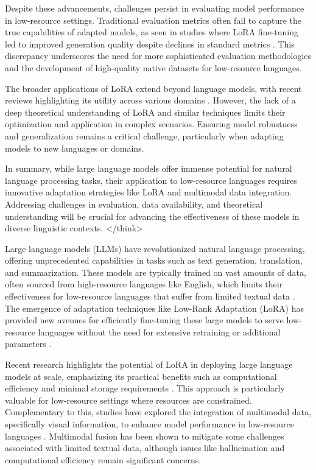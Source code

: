 \documentclass[conference]{IEEEtran}
\begin{document}
Despite these advancements, challenges persist in evaluating model performance in low-resource settings. Traditional evaluation metrics often fail to capture the true capabilities of adapted models, as seen in studies where LoRA fine-tuning led to improved generation quality despite declines in standard metrics \cite{b5}. This discrepancy underscores the need for more sophisticated evaluation methodologies and the development of high-quality native datasets for low-resource languages.

The broader applications of LoRA extend beyond language models, with recent reviews highlighting its utility across various domains \cite{b6}. However, the lack of a deep theoretical understanding of LoRA and similar techniques limits their optimization and application in complex scenarios. Ensuring model robustness and generalization remains a critical challenge, particularly when adapting models to new languages or domains.

In summary, while large language models offer immense potential for natural language processing tasks, their application to low-resource languages requires innovative adaptation strategies like LoRA and multimodal data integration. Addressing challenges in evaluation, data availability, and theoretical understanding will be crucial for advancing the effectiveness of these models in diverse linguistic contexts.
</think>

Large language models (LLMs) have revolutionized natural language processing, offering unprecedented capabilities in tasks such as text generation, translation, and summarization. These models are typically trained on vast amounts of data, often sourced from high-resource languages like English, which limits their effectiveness for low-resource languages that suffer from limited textual data \cite{b1}. The emergence of adaptation techniques like Low-Rank Adaptation (LoRA) has provided new avenues for efficiently fine-tuning these large models to serve low-resource languages without the need for extensive retraining or additional parameters \cite{b2}.

Recent research highlights the potential of LoRA in deploying large language models at scale, emphasizing its practical benefits such as computational efficiency and minimal storage requirements \cite{b1}. This approach is particularly valuable for low-resource settings where resources are constrained. Complementary to this, studies have explored the integration of multimodal data, specifically visual information, to enhance model performance in low-resource languages \cite{b3}. Multimodal fusion has been shown to mitigate some challenges associated with limited textual data, although issues like hallucination and computational efficiency remain significant concerns.
\end{document}
